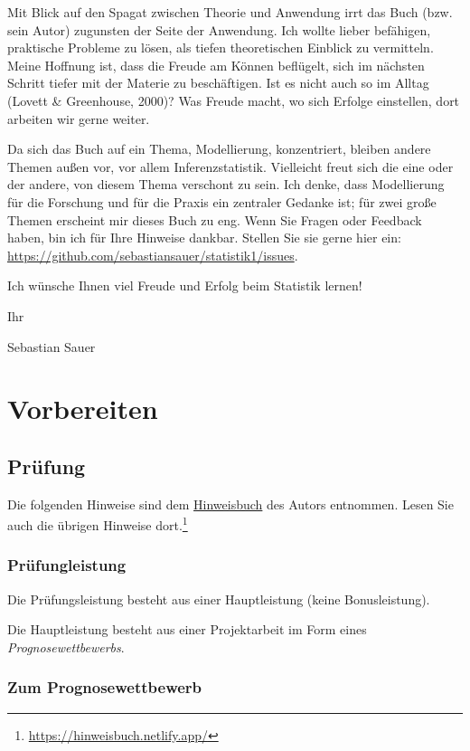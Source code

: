 \documentclass[
  a4paper,
]{scrbook}
\theoremstyle{definition}
\theoremstyle{definition}
\theoremstyle{definition}
\theoremstyle{remark}
\begin{document}
Mit Blick auf den Spagat zwischen Theorie und Anwendung irrt das Buch
(bzw. sein Autor) zugunsten der Seite der Anwendung. Ich wollte lieber
befähigen, praktische Probleme zu lösen, als tiefen theoretischen
Einblick zu vermitteln. Meine Hoffnung ist, dass die Freude am Können
beflügelt, sich im nächsten Schritt tiefer mit der Materie zu
beschäftigen. Ist es nicht auch so im Alltag (Lovett \& Greenhouse,
2000)? Was Freude macht, wo sich Erfolge einstellen, dort arbeiten wir
gerne weiter.

Da sich das Buch auf ein Thema, Modellierung, konzentriert, bleiben
andere Themen außen vor, vor allem Inferenzstatistik. Vielleicht freut
sich die eine oder der andere, von diesem Thema verschont zu sein. Ich
denke, dass Modellierung für die Forschung und für die Praxis ein
zentraler Gedanke ist; für zwei große Themen erscheint mir dieses Buch
zu eng. Wenn Sie Fragen oder Feedback haben, bin ich für Ihre Hinweise
dankbar. Stellen Sie sie gerne hier ein:
\url{https://github.com/sebastiansauer/statistik1/issues}.

Ich wünsche Ihnen viel Freude und Erfolg beim Statistik lernen!

Ihr

Sebastian Sauer

\part{Vorbereiten}

\chapter{Prüfung}\label{pruxfcfung-1}

Die folgenden Hinweise sind dem
\href{https://hinweisbuch.netlify.app/}{Hinweisbuch} des Autors
entnommen. Lesen Sie auch die übrigen Hinweise dort.\footnote{\url{https://hinweisbuch.netlify.app/}}

\section{Prüfungleistung}\label{pruxfcfungleistung-1}

Die Prüfungsleistung besteht aus einer Hauptleistung (keine
Bonusleistung).

Die Hauptleistung besteht aus einer Projektarbeit im Form eines
\emph{Prognosewettbewerbs}.

\section{Zum Prognosewettbewerb}\label{zum-prognosewettbewerb-1}
\end{document}
